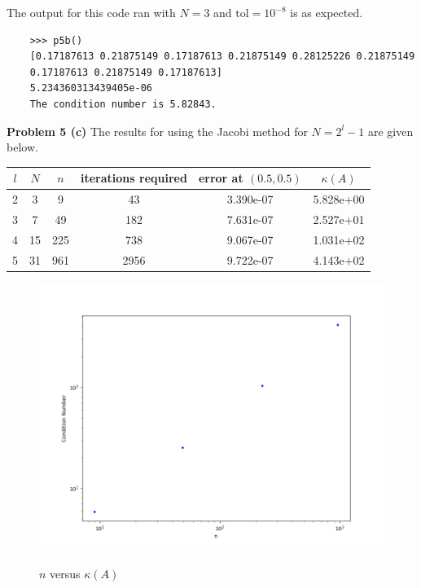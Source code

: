 \documentclass[12pt]{article}
\newcommand{\problem}[1]{\hspace{-4 ex} \large \textbf{Problem #1} }
\begin{document}
The output for this code ran with $N = 3$ and $\text{tol} = 10^{-8}$ is as expected.
\begin{lstlisting}
	>>> p5b()
	[0.17187613 0.21875149 0.17187613 0.21875149 0.28125226 0.21875149
	0.17187613 0.21875149 0.17187613]
	5.234360313439405e-06
	The condition number is 5.82843.
\end{lstlisting}

\bigbreak

\problem{5 (c)} The results for using the Jacobi method for $N = 2^l - 1$ are given below.
	\begin{center}
		\begin{tabular}{|c|c|c|c|c|c|}
			\hline
			$l$&$N$&$n$&iterations required&error at $(0.5,0.5)$&$\kappa(A)$\\ \hline
			2&3&9&43&3.390e-07&5.828e+00\\ \hline
			3&7&49&182&7.631e-07&2.527e+01\\ \hline
			4&15&225&738&9.067e-07&1.031e+02\\ \hline
			5&31&961&2956&9.722e-07&4.143e+02\\ \hline
		\end{tabular}
	\end{center}



\begin{figure}[H]
	\caption{$n$ versus $\kappa(A)$}
	\includegraphics[width=1\textwidth]{hwch7_figure_1}
	\label{5c1}
	\centering
\end{figure}
\end{document}
